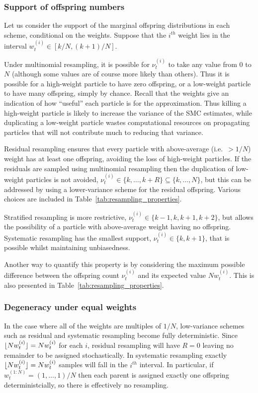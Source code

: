\subsubsection{Support of offspring numbers \seb{$\checkmark$} }
Let us consider the support of the marginal offspring distributions in each scheme, conditional on the weights. Suppose that the $i^{th}$ weight lies in the interval $w_t^{(i)} \in [k/N, (k+1)/N]$.

Under multinomial resampling, it is possible for $\nu_t^{(i)}$ to take any value from $0$ to $N$ (although some values are of course more likely than others).
Thus it is possible for a high-weight particle to have zero offspring, or a low-weight particle to have many offspring, simply by chance.
Recall that the weights give an indication of how ``useful'' each particle is for the approximation. Thus killing a high-weight particle is likely to increase the variance of the SMC estimates, while duplicating a low-weight particle wastes computational resources on propagating particles that will not contribute much to reducing that variance.

Residual resampling ensures that every particle with above-average (i.e.\ $>1/N$) weight has at least one offspring, avoiding the loss of high-weight particles. If the residuals are sampled using multinomial resampling then the duplication of low-weight particles is not avoided, $\nu_t^{(i)} \in \{k, \dots, k+R\} \subseteq \{k,\dots, N\}$, but this can be addressed by using a lower-variance scheme for the residual offspring. Various choices are included in Table~\ref{tab:resampling_properties}.

Stratified resampling is more restrictive, $\nu_t^{(i)} \in \{k-1, k, k+1, k+2\}$, but allows the possibility of a particle with above-average weight having no offspring. 
Systematic resampling has the smallest support, $\nu_t^{(i)} \in \{k, k+1\}$, that is possible whilst maintaining unbiasedness.

Another way to quantify this property is by considering the maximum possible difference between the offspring count $\nu_t^{(i)}$ and its expected value $N w_t^{(i)}$. This is also presented in Table~\ref{tab:resampling_properties}.




\subsubsection{Degeneracy under equal weights \seb{$\checkmark$} }
In the case where all of the weights are multiples of $1/N$, low-variance schemes such as residual and systematic resampling become fully deterministic. 
Since $\lfloor N w_t^{(i)} \rfloor = Nw_t^{(i)}$ for each $i$, residual resampling will have $R=0$ leaving no remainder to be assigned stochastically. 
In systematic resampling exactly $\lfloor N w_t^{(i)} \rfloor = Nw_t^{(i)}$ samples will fall in the $i^{th}$ interval.
In particular, if $w_t^{(1:N)} = (1,\dots, 1)/N$ then each parent is assigned exactly one offspring deterministcially, so there is effectively no resampling.

